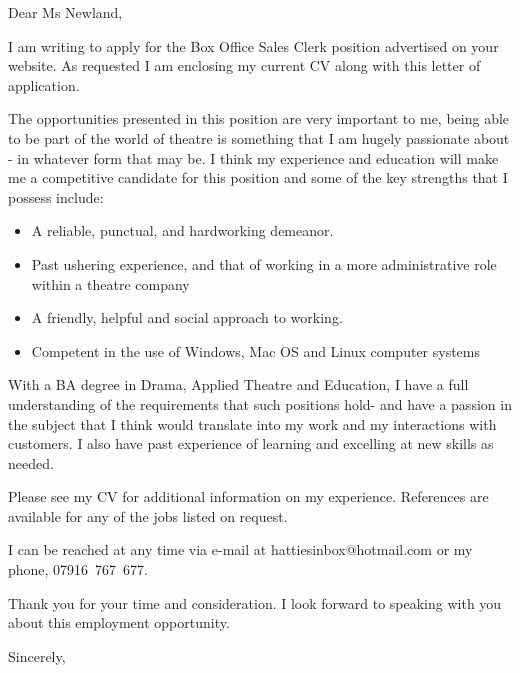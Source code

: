 \documentclass{letter}
\begin{document}
\sffamily
\begin{letter}{}
\opening{Dear Ms Newland,}

I am writing to apply for the Box Office Sales Clerk position advertised on your website.  As requested I am enclosing my current CV along with this letter of application.

The opportunities presented in this position are very important to me, being able to be part of the world of theatre is something that I am hugely passionate about - in whatever form that may be. I think my experience and education will make me a competitive candidate for this position and some of the key strengths that I possess include:
\begin{itemize}
\item A reliable, punctual, and hardworking demeanor.
\item Past ushering experience, and that of working in a more administrative role within a theatre company
\item A friendly, helpful and social approach to working.
\item Competent in the use of Windows, Mac OS and Linux computer systems
\end{itemize}

With a BA degree in Drama, Applied Theatre and Education, I have a full understanding of the requirements that such positions hold- and have a passion in the subject that I think would translate into my work and my interactions with customers. I also have past experience of learning and excelling at new skills as needed.

Please see my CV for additional information on my experience. References are available for any of the jobs listed on request.

I can be reached at any time via e-mail at \mbox{hattiesinbox@hotmail.com} or my phone, \mbox{07916 767 677}.

Thank you for your time and consideration. I look forward to speaking with you about this employment opportunity.

\closing{Sincerely,}
\end{letter}
\end{document}
